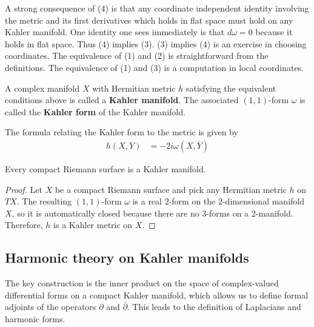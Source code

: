 \documentclass[12pt]{article}
\begin{document}
\begin{remark}
    A strong consequence of (4) is that any coordinate independent identity involving the metric and its first derivatives which holds in flat space must hold on any Kahler manifold. One identity one sees immediately is that $d \omega = 0$ because it holds in flat space. Thus (4) implies (3). (3) implies (4) is an exercise in choosing coordinates. The equivalence of (1) and (2) is straightforward from the definitions. The equivalence of (1) and (3) is a computation in local coordinates.
\end{remark}

\begin{definition}
    A complex manifold $X$ with Hermitian metric $h$ satisfying the equivalent conditions above is called a \textbf{Kahler manifold}. The associated $(1,1)$-form $\omega$ is called the \textbf{Kahler form} of the Kahler manifold.
\end{definition}

The formula relating the Kahler form to the metric is given by \begin{align*}
    h(X,Y) & = -2i\omega(X, \overline{Y})
\end{align*}

\begin{theorem}
    Every compact Riemann surface is a Kahler manifold.
\end{theorem}

\begin{proof}
    Let $X$ be a compact Riemann surface and pick any Hermitian metric $h$ on $TX$. The resulting $(1,1)$-form $\omega$ is a real $2$-form on the $2$-dimensional manifold $X$, so it is automatically closed because there are no $3$-forms on a $2$-manifold. Therefore, $h$ is a Kahler metric on $X$.
\end{proof}

\subsection{Harmonic theory on Kahler manifolds}
The key construction is the inner product on the space of complex-valued differential forms on a compact Kahler manifold, which allows us to define formal adjoints of the operators $\partial$ and $\bar{\partial}$. This leads to the definition of Laplacians and harmonic forms.
\end{document}
